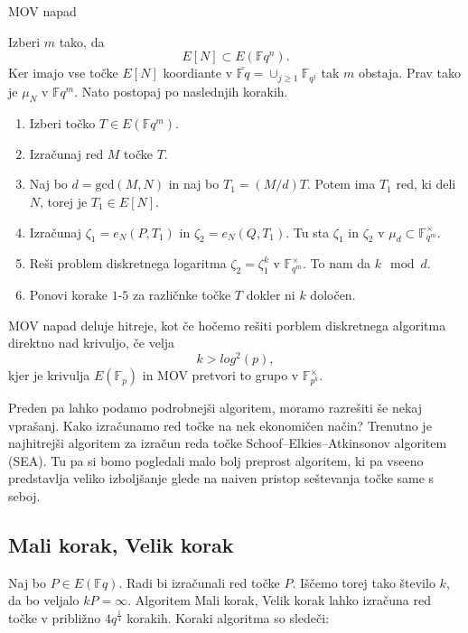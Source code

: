 \documentclass[12pt,a4paper,twoside]{article}
\theoremstyle{definition} %
\theoremstyle{plain} %
\numberwithin{equation}{section}  %
\newcommand{\F}{\mathbb F}
\newcommand{\E}[1]{E({#1})}
\begin{document}
\begin{algorithm}[H]
\caption[MOV]{MOV napad}
\label{alg:MOV}
Izberi $m$ tako, da $$E[N] \subset \E{\F{q^n}}.$$
Ker imajo vse točke $E[N]$ koordiante v $\bar{\F{q}} = \cup_{j\geq 1}\F_{q^j}$ tak $m$ obstaja. Prav tako je $\mu_N$ v $\F{q^m}$.
Nato postopaj po naslednjih korakih.
\begin{enumerate}
\item Izberi točko $T \in \E{\F{q^m}}$.
\item Izračunaj red $M$ točke $T$.
\item Naj bo $d = \text{gcd}(M,N)$ in naj bo $T_1 = (M/d)T$. Potem ima $T_1$ red, ki deli $N$, torej je $T_1 \in E[N]$.
\item Izračunaj $\zeta_1 = e_N(P,T_1)$ in $\zeta_2 = e_N(Q,T_1)$. Tu sta $\zeta_1$ in $\zeta_2$ v $\mu_d \subset \F_{q^m}^\times$.
\item Reši problem diskretnega logaritma $\zeta_2 = \zeta_1^k$ v $\F_{q^m}^\times$. To nam da $k \mod d$.
\item Ponovi korake $1$-$5$ za različnke točke $T$ dokler ni $k$ določen.
\end{enumerate}

\end{algorithm}
MOV napad deluje hitreje, kot če hočemo rešiti porblem diskretnega algoritma direktno nad krivuljo, če velja 
$$k > log^2(p),$$
kjer je krivulja $E(\F_p)$ in MOV pretvori to grupo v $\F^{\times}_{p^k}$.

Preden pa lahko podamo podrobnejši algoritem, moramo razrešiti še nekaj vprašanj. Kako izračunamo red točke na nek ekonomičen način? Trenutno je najhitrejši algoritem za izračun reda točke Schoof–Elkies–Atkinsonov algoritem (SEA). Tu pa si bomo pogledali malo bolj preprost algoritem, ki pa vseeno predstavlja veliko izboljšanje glede na naiven pristop seštevanja točke same s seboj.
\subsection{Mali korak, Velik korak}
Naj bo $P \in E(\F{q})$. Radi bi izračunali red točke $P$. Iščemo torej tako število $k$, da bo veljalo $kP = \infty$. Algoritem Mali korak, Velik korak lahko izračuna red točke v približno $4q^{\frac{1}{4}}$ korakih. Koraki algoritma so sledeči:
\end{document}
